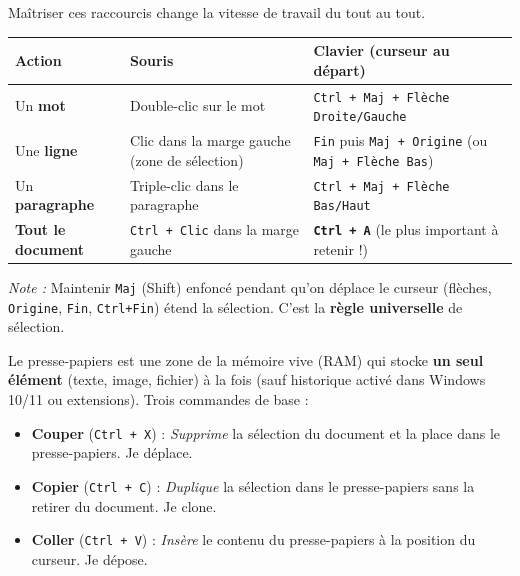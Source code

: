 \documentclass[11pt]{article}
\newcommand{\cle}[1]{{\popxbold\color{popdark}#1}}
\begin{document}
\begin{propriete}
Maîtriser ces raccourcis change la vitesse de travail du tout au tout.
\begin{center}
\begin{tabularx}{\linewidth}{|l|X|X|}
\hline
\rowcolor{popblueL}
\textbf{Action} & \textbf{Souris} & \textbf{Clavier (curseur au départ)} \\
\hline
Un \textbf{mot} & Double-clic sur le mot & \texttt{Ctrl + Maj + Flèche Droite/Gauche} \\
Une \textbf{ligne} & Clic dans la marge gauche (zone de sélection) & \texttt{Fin} puis \texttt{Maj + Origine} (ou \texttt{Maj + Flèche Bas}) \\
Un \textbf{paragraphe} & Triple-clic dans le paragraphe & \texttt{Ctrl + Maj + Flèche Bas/Haut} \\
\textbf{Tout le document} & \texttt{Ctrl + Clic} dans la marge gauche & \textbf{\texttt{Ctrl + A}} (le plus important à retenir !) \\
\hline
\end{tabularx}
\end{center}
\emph{Note :} Maintenir \texttt{Maj} (Shift) enfoncé pendant qu'on déplace le curseur (flèches, \texttt{Origine}, \texttt{Fin}, \texttt{Ctrl+Fin}) étend la sélection. C'est la \textbf{règle universelle} de sélection.
\end{propriete}

\begin{definition}
Le \cle{presse-papiers} est une zone de la mémoire vive (RAM) qui stocke \textbf{un seul élément} (texte, image, fichier) à la fois (sauf historique activé dans Windows 10/11 ou extensions). Trois commandes de base :
\begin{itemize}
    \item \textbf{Couper} (\texttt{Ctrl + X}) : \emph{Supprime} la sélection du document et la place dans le presse-papiers. \og Je déplace. \fg{}
    \item \textbf{Copier} (\texttt{Ctrl + C}) : \emph{Duplique} la sélection dans le presse-papiers sans la retirer du document. \og Je clone. \fg{}
    \item \textbf{Coller} (\texttt{Ctrl + V}) : \emph{Insère} le contenu du presse-papiers à la position du curseur. \og Je dépose. \fg{}
\end{itemize}
\end{definition}
\end{document}
